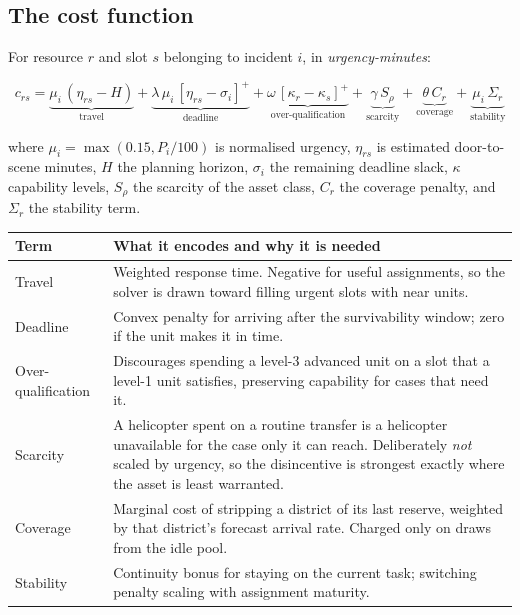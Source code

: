 \subsection{The cost function}

For resource $r$ and slot $s$ belonging to incident $i$, in \emph{urgency-minutes}:

\[
c_{rs} =
\underbrace{\mu_i\,(\eta_{rs} - H)}_{\text{travel}}
+ \underbrace{\lambda\,\mu_i\,[\eta_{rs}-\sigma_i]^+}_{\text{deadline}}
+ \underbrace{\omega\,[\kappa_r-\kappa_s]^+}_{\text{over-qualification}}
+ \underbrace{\gamma\,S_\rho}_{\text{scarcity}}
+ \underbrace{\theta\,C_r}_{\text{coverage}}
+ \underbrace{\mu_i\,\Sigma_r}_{\text{stability}}
\]

\noindent where $\mu_i = \max(0.15, P_i/100)$ is normalised urgency,
$\eta_{rs}$ is estimated door-to-scene minutes, $H$ the planning horizon,
$\sigma_i$ the remaining deadline slack, $\kappa$ capability levels, $S_\rho$
the scarcity of the asset class, $C_r$ the coverage penalty, and $\Sigma_r$
the stability term.

\begin{center}\footnotesize
\begin{tabular}{@{}lp{104mm}@{}}
\toprule
\textbf{Term} & \textbf{What it encodes and why it is needed} \\
\midrule
Travel & Weighted response time. Negative for useful assignments, so the solver is drawn toward filling urgent slots with near units. \\
Deadline & Convex penalty for arriving after the survivability window; zero if the unit makes it in time. \\
Over-qualification & Discourages spending a level-3 advanced unit on a slot that a level-1 unit satisfies, preserving capability for cases that need it. \\
Scarcity & A helicopter spent on a routine transfer is a helicopter unavailable for the case only it can reach. Deliberately \emph{not} scaled by urgency, so the disincentive is strongest exactly where the asset is least warranted. \\
Coverage & Marginal cost of stripping a district of its last reserve, weighted by that district's forecast arrival rate. Charged only on draws from the idle pool. \\
Stability & Continuity bonus for staying on the current task; switching penalty scaling with assignment maturity. \\
\bottomrule
\end{tabular}
\end{center}

